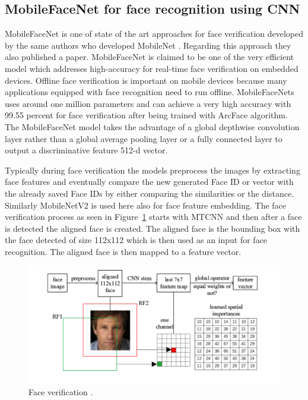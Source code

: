 \subsection{MobileFaceNet for face recognition using CNN}

MobileFaceNet is one of state of the art approaches for face verification developed by the same authors who developed MobileNet \cite{howard2017mobilenets}. Regarding this approach they also published a paper. MobileFaceNet \cite{Chen2018MobileFaceNetsEC} is claimed to be one of the very efficient model which addresses high-accuracy for real-time face verification on embedded devices. Offline face verification is important on mobile devices because many applications equipped with face recognition need to run offline. 
MobileFaceNets uses around one million parameters and can achieve a very high accuracy with 99.55 percent for face verification after being trained with ArcFace algorithm. The MobileFaceNet model takes the advantage of a global
depthwise convolution layer rather than a global average pooling layer or a fully
connected layer to output a discriminative feature 512-d vector. 

Typically during face verification the models preprocess the images by extracting face features and eventually compare the new generated Face ID or vector with the already saved Face IDs by either comparing the similarities or the distance. Similarly MobileNetV2 is used here also for face feature embedding. The face verification process as seen in Figure~\ref{fig:face_ver} starts with MTCNN and then after a face is detected the aligned face is created. The aligned face is the bounding box with the face detected of size 112x112 which is then used as an input for face recognition. The aligned face is then mapped to a feature vector. 


\begin{figure}[!htb]
    \centering
    \includegraphics[width=1\textwidth]{figures/face_recognition.png}
    \caption{Face verification \cite{Chen2018MobileFaceNetsEC}.}
    \label{fig:face_ver}
\end{figure}

